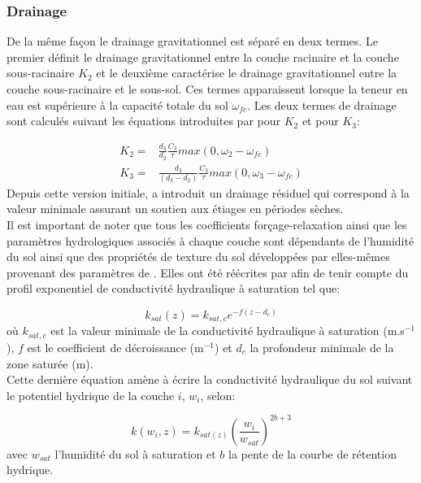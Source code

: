 \subsubsection{{\selectfont Drainage}}
%
De la même façon le drainage gravitationnel est séparé en deux termes. Le premier définit le drainage gravitationnel entre la couche racinaire et la couche sous-racinaire $K_{2}$ et le deuxième caractérise le drainage gravitationnel entre la couche sous-racinaire et le sous-sol. Ces termes apparaissent lorsque la teneur en eau est supérieure à la capacité totale du sol $\omega_{fc}$. Les deux termes de drainage sont calculés suivant les équations introduites par \citet{mahfouf1996} pour $K_{2}$ et \citet{boone1999} pour $K_{3}$:

\begin{align}
K_{2} =& \frac{d_{3}}{d_{2}}\frac{C_{3}}{\tau}max(0,\omega_{2}-\omega_{fc})
\\
K_{3} =& \frac{d_{3}}{(d_{3}-d_{2})}\frac{C_{3}}{\tau}max(0,\omega_{3}-\omega_{fc})
\end{align} 
%
Depuis cette version initiale, \citet{habets1999} a introduit un drainage résiduel qui correspond à la valeur minimale assurant un soutien aux étiages en périodes sèches.\\

\noindent Il est important de noter que tous les coefficients forçage-relaxation ainsi que les paramètres hydrologiques associés à chaque couche sont dépendants de l'humidité du sol ainsi que des propriétés de texture du sol développées par \citet{noilhan1995} elles-mêmes provenant des paramètres de \citet{clapp1978}. Elles ont été réécrites par \citet{decharme2006} afin de tenir compte du profil exponentiel de conductivité hydraulique à saturation tel que:

\begin{equation}
k_{sat}(z) = k_{sat,c} e^{-f(z-d_{c})}
\end{equation}
où $k_{sat,c}$ est la valeur minimale de la conductivité hydraulique à saturation (m.s$^{-1}$), $f$ est le coefficient de décroissance (m$^{-1}$) et $d_{c}$ la profondeur minimale de la zone saturée (m).\\

Cette dernière équation amène à écrire la conductivité hydraulique du sol suivant le potentiel hydrique de la couche $i$, $w_{i}$, selon:

\begin{equation}
k(w_{i},z) = k_{sat(z)} \left(\frac{w_{i}}{w_{sat}}\right)^{2b+3}
\end{equation}
avec $w_{sat}$ l'humidité du sol à saturation et $b$ la pente de la courbe de rétention hydrique.

